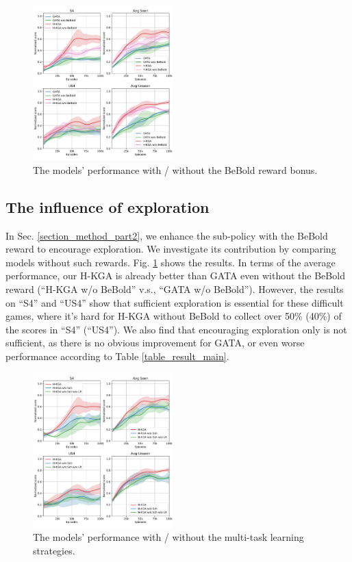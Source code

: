 \documentclass[11pt]{article}
\begin{document}
\begin{figure}[t!]
\centering
\includegraphics[width=0.48\textwidth]{exp2main_woBeBold.pdf}
\caption{The models' performance with / without the BeBold reward bonus.}
\label{exp2main_woBeBold}
\end{figure}

\subsection{The influence of exploration \label{section_exp_bebold}}

In Sec. \ref{section_method_part2}, we enhance the sub-policy with the BeBold reward to encourage exploration. 
We investigate its contribution by comparing models without such rewards. 
Fig. \ref{exp2main_woBeBold} shows the results. 
In terms of the average performance, our H-KGA is already better than GATA even without the BeBold reward (``H-KGA w/o BeBold'' v.s., ``GATA w/o BeBold''). 
However, the results on ``S4'' and ``US4'' show that sufficient exploration is essential for these difficult games, where it's hard for H-KGA without BeBold to collect over 50\% (40\%) of the scores in ``S4'' (``US4''). 
We also find that encouraging exploration only is not sufficient, as there is no obvious improvement for GATA, or even worse performance according to Table \ref{table_result_main}. 

\begin{figure}[t!]
\centering
\includegraphics[width=0.48\textwidth]{exp3main_woMTL.pdf}
\caption{The models' performance with / without the multi-task learning strategies. }
\label{exp3main_woMTL}
\end{figure}
\end{document}
